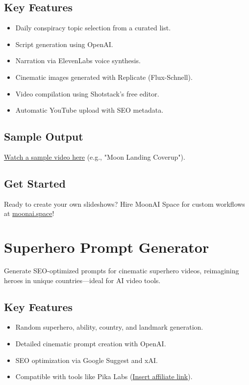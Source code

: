 \documentclass[a4paper,10pt]{article}
\begin{document}
\subsection{Key Features}
\begin{itemize}[label={\color{neonmagenta}$\bullet$}]
    \item Daily conspiracy topic selection from a curated list.
    \item Script generation using OpenAI.
    \item Narration via ElevenLabs voice synthesis.
    \item Cinematic images generated with Replicate (Flux-Schnell).
    \item Video compilation using Shotstack’s free editor.
    \item Automatic YouTube upload with SEO metadata.
\end{itemize}

\subsection{Sample Output}
\href{https://youtube.com/sample-link}{Watch a sample video here} (e.g., "Moon Landing Coverup").

\subsection{Get Started}
\color{neoncyan} Ready to create your own slideshows? Hire MoonAI Space for custom workflows at \href{https://moonai.space}{moonai.space}!
\newpage

\section{Superhero Prompt Generator}
\color{spacewhite}
Generate SEO-optimized prompts for cinematic superhero videos, reimagining heroes in unique countries—ideal for AI video tools.

\subsection{Key Features}
\begin{itemize}[label={\color{neonmagenta}$\bullet$}]
    \item Random superhero, ability, country, and landmark generation.
    \item Detailed cinematic prompt creation with OpenAI.
    \item SEO optimization via Google Suggest and xAI.
    \item Compatible with tools like Pika Labs (\href{https://pikalabs.com}{Insert affiliate link}).
\end{itemize}
\end{document}
